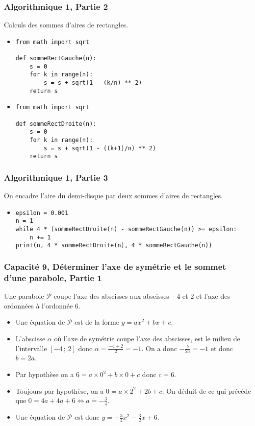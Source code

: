 \documentclass[11pt, hyperref={urlcolor=red,%
            linkcolor=blue, %
            colorlinks=true}]{beamer}
\newcommand{\Interff}[2]{\left[#1\, ;\, #2\right]}
\begin{document}
\begin{frame}[fragile]
\frametitle{Algorithmique 1, Partie 2}
Calculs des sommes d'aires de rectangles.

\begin{itemize}
\pause \item \begin{lstlisting}[style=rond]
from math import sqrt

def sommeRectGauche(n):
    s = 0
    for k in range(n):
        s = s + sqrt(1 - (k/n) ** 2)
    return s
\end{lstlisting}
\pause \item \begin{lstlisting}[style=rond]
from math import sqrt

def sommeRectDroite(n):
    s = 0
    for k in range(n):
        s = s + sqrt(1 - ((k+1)/n) ** 2)
    return s
\end{lstlisting}
\end{itemize}
\end{frame}



\begin{frame}[fragile]
\frametitle{Algorithmique 1, Partie 3}
On encadre  l'aire du demi-disque par deux sommes d'aires de rectangles.

\begin{itemize}
\pause \item \begin{lstlisting}[style=rond]
epsilon = 0.001
n = 1
while 4 * (sommeRectDroite(n) - sommeRectGauche(n)) >= epsilon:
    n += 1
print(n, 4 * sommeRectDroite(n), 4 * sommeRectGauche(n))
\end{lstlisting}
\end{itemize}
\end{frame}


\begin{frame}
\label{capacite9}
\frametitle{Capacité 9, Déterminer l'axe de symétrie et le sommet d'une parabole, Partie 1}
Une parabole $\mathcal{P}$  coupe l'axe des abscisses aux abscisses $-4$ et $2$ et l'axe des ordonnées à l'ordonnée $6$.


\begin{itemize}
\pause \item Une équation de $\mathcal{P}$ est de la forme $y=ax^{2}+bx+c$.
\pause \item L'abscisse $\alpha$ où l'axe de symétrie coupe l'axe des abscisses, est le milieu de l'intervalle $\Interff{-4}{2}$ donc $\alpha = \frac{-4+2}{2}=-1$. On a donc $-\frac{b}{2a}=-1$ et donc $b=2a$.
\pause \item Par hypothèse on a $6=a\times 0^{2}+ b \times 0 + c$ donc $c=6$.
\pause \item Toujours par hypothèse, on a $0 = a \times 2^{2} + 2b+c$. On déduit de ce qui précède que $0=4a+4a+6 \Leftrightarrow a =-\frac{3}{4}$.
\pause \item Une équation de $\mathcal{P}$  est donc $y=-\frac{3}{4}x^{2}-\frac{3}{2}x+6$.
\end{itemize}
\end{frame}
\end{document}
